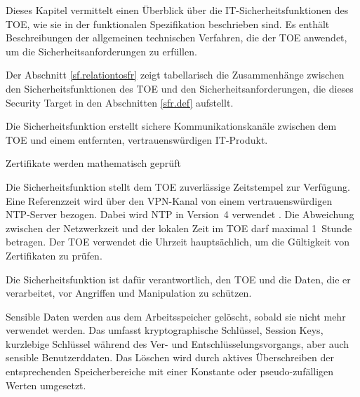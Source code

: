 
Dieses Kapitel vermittelt einen Überblick über die IT-Sicherheitsfunktionen des
TOE, wie sie in der funktionalen Spezifikation beschrieben sind. Es enthält
Beschreibungen der allgemeinen technischen Verfahren, die der TOE anwendet, um
die Sicherheitsanforderungen zu erfüllen.

Der Abschnitt \hyperref[sf.relationtosfr]{\ref*{sf.relationtosfr}} zeigt
tabellarisch die Zusammenhänge zwischen den Sicherheitsfunktionen des TOE und
den Sicherheitsanforderungen, die dieses Security Target in den Abschnitten
\hyperref[sfr.def]{\ref*{sfr.def}} aufstellt.
 



Die Sicherheitsfunktion  erstellt sichere Kommunikationskanäle
zwischen dem TOE und einem entfernten, vertrauenswürdigen IT-Produkt.


Zertifikate werden mathematisch geprüft



Die Sicherheitsfunktion  stellt dem TOE zuverlässige
Zeitstempel zur Verfügung. Eine Referenzzeit wird über den VPN-Kanal von einem
vertrauenswürdigen NTP-Server bezogen. Dabei wird NTP in Version~4 verwendet
\cite{rfc5905}. Die Abweichung zwischen der Netzwerkzeit und der lokalen Zeit im
TOE darf maximal 1~Stunde betragen. Der TOE verwendet die Uhrzeit hauptsächlich,
um die Gültigkeit von Zertifikaten zu prüfen.



Die Sicherheitsfunktion  ist dafür
verantwortlich, den TOE und die Daten, die er verarbeitet, vor
Angriffen und Manipulation zu schützen.

Sensible Daten werden aus dem Arbeitsspeicher gelöscht, sobald sie
nicht mehr verwendet werden. Das umfasst kryptographische Schlüssel,
Session Keys, kurzlebige Schlüssel während des Ver- und
Entschlüsselungsvorgangs, aber auch sensible Benutzerddaten. Das
Löschen wird durch aktives Überschreiben der entsprechenden
Speicherbereiche mit einer Konstante oder pseudo-zufälligen Werten
umgesetzt.

